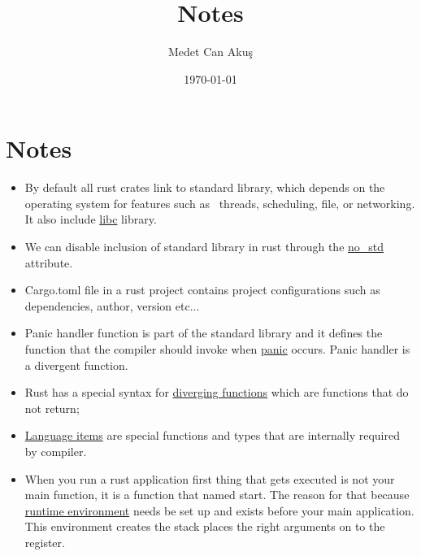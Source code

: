 \documentclass{article}
\title{Notes}
\author{Medet Can Akuş}
\date{\today}
\begin{document}
\tableofcontents
\maketitle
\section{Notes}
 \begin{itemize}
    \item By default all rust crates link to standard library, which depends on the operating system for features such as \
    threads, scheduling, file, or networking. It also include \hyperlink{ref:libc}{libc} library. 
    \item We can disable inclusion of standard library in rust through the \hyperlink{ref:attribute}{no\_std} attribute.
    \item Cargo.toml file in a rust project contains project configurations such as dependencies, author, version etc...
    \item Panic handler function is part of the standard library and it defines the function that the compiler should invoke when \hyperlink{ref:panic}{panic} occurs. Panic handler is a divergent function.
    \item Rust has a special syntax for \hyperlink{ref:diverging-function}{diverging functions} which are functions that do not return;
    \item \hyperlink{ref:language-item}{Language items} are special functions and types that are internally required by compiler.
    \item When you run a rust application first thing that gets executed is not your main function, it is a function that named start.
    The reason for that because \hyperlink{ref:runtime-environment}{runtime environment} needs be set up and exists before your main application. This environment creates the stack places the right arguments 
    on to the register.
 \end{itemize}
\end{document}
